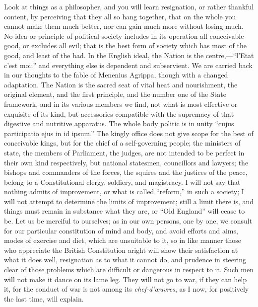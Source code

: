 Look at things as a philosopher, and you will
learn resignation, or rather thankful content, by perceiving that they
all so hang together, that on the whole you cannot make them much
better, nor can gain much more without losing much. No idea or
principle of political society includes in its operation all
conceivable good, or excludes all evil; that is the best form of
society which has most of the good, and least of the bad. In the
English ideal, the Nation is the centre,—``l'Etat c'est moi:'' and
everything else is dependent and subservient. We are carried back in
our thoughts to the fable of Menenius Agrippa, though with a changed
adaptation. The Nation is the sacred seat of vital heat and
nourishment, the original element, and the first principle, and the
number one of the State framework, and in its various members we find,
not what is most effective or exquisite of its kind, but accessories
compatible with the supremacy of that digestive and nutritive
apparatus. The whole body politic is in unity ``cujus participatio ejus
in id ipsum.'' The kingly office does not give scope for the best of
conceivable kings, but for the chief of a self-governing people; the
ministers of state, the members of Parliament, the judges, are not
intended to be perfect in their own kind respectively, but national
statesmen, councillors and lawyers; the bishops and commanders of the
forces, the squires and the justices of the peace, belong to a
Constitutional clergy, soldiery, and magistracy. I will not say that
nothing admits of improvement, or what is called ``reform,'' in such a
society; I will not attempt to determine the limits of improvement;
still a limit there is, and things must remain in substance what
they are, or ``Old England'' will cease to be. Let us be merciful to
ourselves; as in our own persons, one by one, we consult for our
particular constitution of mind and body, and avoid efforts and aims,
modes of exercise and diet, which are unsuitable to it, so in like
manner those who appreciate the British Constitution aright will show
their satisfaction at what it does well, resignation as to what it
cannot do, and prudence in steering clear of those problems which are
difficult or dangerous in respect to it. Such men will not make it
dance on its lame leg. They will not go to war, if they can help it,
for the conduct of war is not among its \emph{chef-d'œuvres}, as I
now, for positively the last time, will explain.

